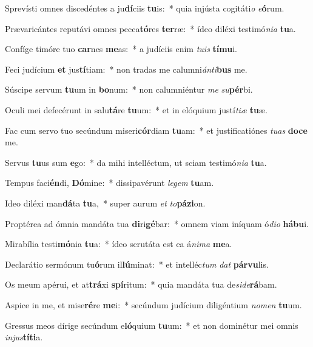 \item Sprevísti omnes discedéntes a ju\textbf{dí}ciis \textbf{tu}is:~* quia injústa cogitáti\textit{o} \textit{e}\textbf{ó}rum.
\item Prævaricántes reputávi omnes pecca\textbf{tó}res \textbf{ter}ræ:~* ídeo diléxi testimó\textit{ni}\textit{a} \textbf{tu}a.
\item Confíge timóre tuo \textbf{car}nes \textbf{me}as:~* a judíciis enim \textit{tu}\textit{is} \textbf{tí}\textbf{mu}i.
\item Feci judícium \textbf{et} jus\textbf{tí}tiam:~* non tradas me calumni\textit{án}\textit{ti}\textbf{bus} me.
\item Súscipe servum \textbf{tu}um in \textbf{bo}num:~* non calumniéntur \textit{me} \textit{su}\textbf{pér}bi.
\item Oculi mei defecérunt in salu\textbf{tá}re \textbf{tu}um:~* et in elóquium justí\textit{ti}\textit{æ} \textbf{tu}æ.
\item Fac cum servo tuo secúndum miseri\textbf{cór}diam \textbf{tu}am:~* et justificatiónes \textit{tu}\textit{as} \textbf{do}\textbf{ce} me.
\item Servus \textbf{tu}us sum \textbf{e}go:~* da mihi intelléctum, ut sciam testimó\textit{ni}\textit{a} \textbf{tu}a.
\item Tempus faci\textbf{én}di, \textbf{Dó}mine:~* dissipavérunt \textit{le}\textit{gem} \textbf{tu}am.
\item Ideo diléxi man\textbf{dá}ta \textbf{tu}a,~* super aurum \textit{et} \textit{to}\textbf{pá}\textbf{zi}on.
\item Proptérea ad ómnia mandáta tua \textbf{di}ri\textbf{gé}bar:~* omnem viam iníquam ó\textit{di}\textit{o} \textbf{há}\textbf{bu}i.
\item Mirabília testi\textbf{mó}nia \textbf{tu}a:~* ídeo scrutáta est ea á\textit{ni}\textit{ma} \textbf{me}a.
\item Declarátio sermónum tu\textbf{ó}rum il\textbf{lú}minat:~* et intelléc\textit{tum} \textit{dat} \textbf{pár}\textbf{vu}lis.
\item Os meum apérui, et at\textbf{trá}xi \textbf{spí}ritum:~* quia mandáta tua de\textit{si}\textit{de}\textbf{rá}bam.
\item Aspice in me, et mise\textbf{ré}re \textbf{me}i:~* secúndum judícium diligéntium \textit{no}\textit{men} \textbf{tu}um.
\item Gressus meos dírige secúndum e\textbf{ló}quium \textbf{tu}um:~* et non dominétur mei omnis \textit{in}\textit{jus}\textbf{tí}\textbf{ti}a.
